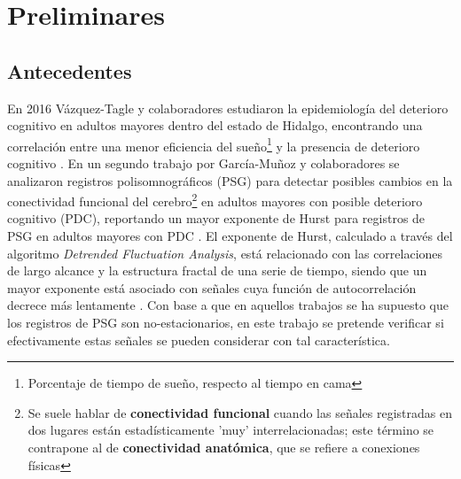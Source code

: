 
\chapter{Preliminares}

\section{Antecedentes}

En 2016 Vázquez-Tagle y colaboradores estudiaron la epidemiología del 
deterioro cognitivo en adultos mayores dentro del estado de Hidalgo,
encontrando una correlación entre una menor eficiencia del sueño\footnote{Porcentaje de tiempo
de sueño, respecto al tiempo en cama} y la presencia de deterioro cognitivo \cite{VazquezTagle16}.
En un segundo trabajo por García-Muñoz y colaboradores \cite{Valeria} se analizaron 
registros polisomnográficos (PSG)
para detectar posibles cambios en la conectividad funcional del cerebro\footnote{Se suele 
hablar de \textbf{conectividad funcional} cuando las señales registradas en dos lugares están 
estadísticamente 'muy' interrelacionadas; este término se contrapone al de \textbf{conectividad 
anatómica}, que se refiere a conexiones físicas} en adultos mayores con posible deterioro 
cognitivo (PDC), reportando un mayor exponente de Hurst para registros de PSG en adultos mayores 
con PDC \cite{Valeria}.
El exponente de Hurst, calculado a través del algoritmo \textit{Detrended Fluctuation Analysis}, 
está relacionado con las correlaciones de largo alcance y la estructura fractal de una serie de 
tiempo, siendo que un mayor exponente está asociado con señales cuya función de 
autocorrelación decrece más lentamente \cite{Rodriguez11}.
Con base a que en aquellos trabajos se ha supuesto que los registros de PSG son no-estacionarios, 
en este trabajo se pretende verificar si efectivamente estas señales se pueden considerar con tal
característica.

